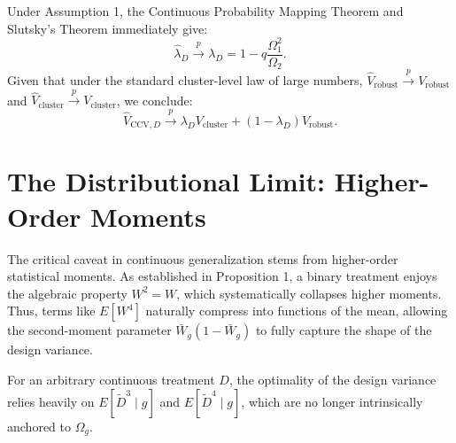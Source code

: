 \documentclass[11pt, letterpaper]{article}
\theoremstyle{remark}
\begin{document}
Under Assumption 1, the Continuous Probability Mapping Theorem and Slutsky's Theorem immediately give:
\begin{equation*}
    \widehat\lambda_D \xrightarrow{p} \lambda_D = 1 - q \frac{\Omega_1^2}{\Omega_2}.
\end{equation*}
Given that under the standard cluster-level law of large numbers, $\widehat V_{\text{robust}} \xrightarrow{p} V_{\text{robust}}$ and $\widehat V_{\text{cluster}} \xrightarrow{p} V_{\text{cluster}}$, we conclude:
\begin{equation*}
    \widehat V_{\text{CCV},D} \xrightarrow{p} \lambda_D V_{\text{cluster}} + (1-\lambda_D)V_{\text{robust}}.
\end{equation*}

\section{The Distributional Limit: Higher-Order Moments}

The critical caveat in continuous generalization stems from higher-order statistical moments. As established in Proposition 1, a binary treatment enjoys the algebraic property $W^2 = W$, which systematically collapses higher moments. Thus, terms like $E[W^4]$ naturally compress into functions of the mean, allowing the second-moment parameter $\bar{W}_g(1-\bar{W}_g)$ to fully capture the shape of the design variance.

For an arbitrary continuous treatment $D$, the optimality of the design variance relies heavily on $E[\widetilde D^3 \mid g]$ and $E[\widetilde D^4 \mid g]$, which are no longer intrinsically anchored to $\Omega_g$.
\end{document}

